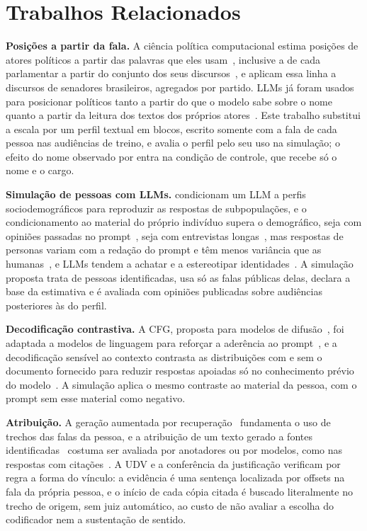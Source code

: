 \section{Trabalhos Relacionados}
\label{sec:relacionados}

\textbf{Posições a partir da fala.} A ciência política computacional estima posições de atores
políticos a partir das palavras que eles usam~\citep{laver2003extracting}, inclusive a de cada
parlamentar a partir do conjunto dos seus discursos~\citep{lauderdale2016measuring}, e
\citet{izumi2021government} aplicam essa linha a discursos de senadores brasileiros, agregados por
partido. LLMs já foram usados para posicionar políticos tanto a partir do que o modelo sabe sobre o
nome~\citep{wu2023large} quanto a partir da leitura dos textos dos próprios
atores~\citep{lemens2025positioning}. Este trabalho substitui a escala por um perfil textual em
blocos, escrito somente com a fala de cada pessoa nas audiências de treino, e avalia o perfil pelo seu
uso na simulação; o efeito do nome observado por \citet{wu2023large} entra na condição de controle,
que recebe só o nome e o cargo.

\textbf{Simulação de pessoas com LLMs.} \citet{argyle2023outofone} condicionam um LLM a perfis
sociodemográficos para reproduzir as respostas de subpopulações, e o condicionamento ao material do
próprio indivíduo supera o demográfico, seja com opiniões passadas no
prompt~\citep{hwang2023aligning}, seja com entrevistas longas~\citep{park2026llm}, mas respostas de
personas variam com a redação do prompt e têm menos variância que as humanas~\citep{bisbee2024synthetic},
e LLMs tendem a achatar e a estereotipar identidades~\citep{wang2025large}. A simulação proposta
trata de pessoas identificadas, usa só as falas públicas delas, declara a base da estimativa e é
avaliada com opiniões publicadas sobre audiências posteriores às do perfil.

\textbf{Decodificação contrastiva.} A CFG, proposta para modelos de difusão~\citep{ho2022classifier},
foi adaptada a modelos de linguagem para reforçar a aderência ao prompt~\citep{sanchez2024stay}, e a
decodificação sensível ao contexto contrasta as distribuições com e sem o documento fornecido para
reduzir respostas apoiadas só no conhecimento prévio do modelo~\citep{shi2024trusting}. A simulação
aplica o mesmo contraste ao material da pessoa, com o prompt sem esse material como negativo.

\textbf{Atribuição.} A geração aumentada por recuperação~\citep{lewis2020rag} fundamenta o uso de
trechos das falas da pessoa, e a atribuição de um texto gerado a fontes
identificadas~\citep{rashkin2023measuring} costuma ser avaliada por anotadores ou por modelos, como nas
respostas com citações~\citep{gao2023enabling}. A UDV e a conferência da justificação verificam por
regra a forma do vínculo: a evidência é uma sentença localizada por offsets na fala da própria
pessoa, e o início de cada cópia citada é buscado literalmente no trecho de origem, sem juiz
automático, ao custo de não avaliar a escolha do codificador nem a sustentação de sentido.
